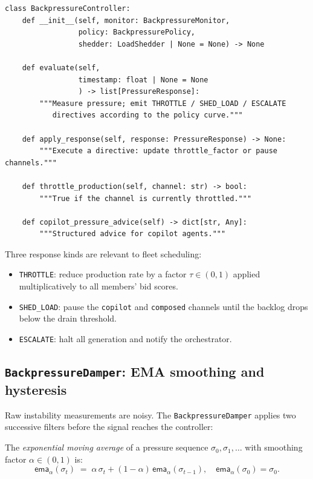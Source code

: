 \documentclass[11pt]{article}
\providecommand{\instab}{\sigma}                   %
\providecommand{\throttlefactor}{\tau}             %
\providecommand{\ema}{\mathsf{ema}}                %
\providecommand{\BPCtrlPY}{\texttt{BackpressureController}}
\providecommand{\DamperPY}{\texttt{BackpressureDamper}}
\begin{document}
\begin{lstlisting}[style=jugeo-python, caption={\BPCtrlPY{} interface.}]
class BackpressureController:
    def __init__(self, monitor: BackpressureMonitor,
                 policy: BackpressurePolicy,
                 shedder: LoadShedder | None = None) -> None

    def evaluate(self,
                 timestamp: float | None = None
                 ) -> list[PressureResponse]:
        """Measure pressure; emit THROTTLE / SHED_LOAD / ESCALATE
           directives according to the policy curve."""

    def apply_response(self, response: PressureResponse) -> None:
        """Execute a directive: update throttle_factor or pause channels."""

    def throttle_production(self, channel: str) -> bool:
        """True if the channel is currently throttled."""

    def copilot_pressure_advice(self) -> dict[str, Any]:
        """Structured advice for copilot agents."""
\end{lstlisting}

Three response kinds are relevant to fleet scheduling:
\begin{itemize}[leftmargin=1.5em]
  \item \texttt{THROTTLE}: reduce production rate by a factor
        $\throttlefactor \in (0, 1)$ applied multiplicatively to all members'
        bid scores.
  \item \texttt{SHED\_LOAD}: pause the \texttt{copilot} and \texttt{composed}
        channels until the backlog drops below the drain threshold.
  \item \texttt{ESCALATE}: halt all generation and notify the orchestrator.
\end{itemize}

\subsection{\DamperPY{}: EMA smoothing and hysteresis}

Raw instability measurements are noisy.  The \DamperPY{} applies two
successive filters before the signal reaches the controller:

\begin{definition}
The \emph{exponential moving average} of a pressure sequence
$\instab_0, \instab_1, \ldots$ with smoothing factor $\alpha \in (0,1)$ is:
\[
  \ema_\alpha(\instab_t)
  \;=\;
  \alpha\,\instab_t + (1 - \alpha)\,\ema_\alpha(\instab_{t-1}),
  \quad \ema_\alpha(\instab_0) = \instab_0.
\]
\end{definition}
\end{document}
